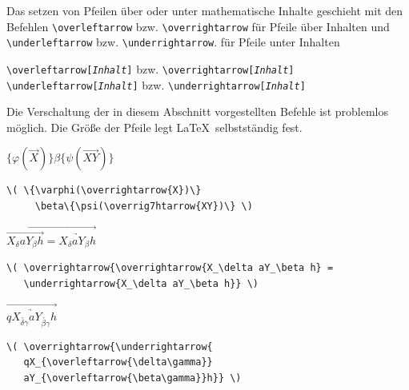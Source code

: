 \documentclass[a4paper,10pt,twoside]{scrbook}
\begin{document}
Das setzen von Pfeilen über oder unter 
mathematische Inhalte geschieht mit den Befehlen 
\verb!\overleftarrow! bzw. 
\verb!\overrightarrow! 
für Pfeile über Inhalten und 
\verb!\underleftarrow! bzw. 
\verb!\underrightarrow!. für 
Pfeile unter Inhalten


\begin{boxedminipage}{\textwidth}
\texttt{\textbackslash overleftarrow[{\textsl{Inhalt}}]} bzw. \texttt{\textbackslash overrightarrow[{\textsl{Inhalt}}]}\\
\texttt{\textbackslash underleftarrow[{\textsl{Inhalt}}]} bzw. \texttt{\textbackslash underrightarrow[{\textsl{Inhalt}}]}
\end{boxedminipage}


Die Verschaltung der in diesem Abschnitt vorgestellten Befehle ist problemlos möglich.
Die Größe der Pfeile legt \LaTeX\ selbstständig fest.

\begin{minipage}[c]{.25\textwidth}
\setlength{\parskip}{1em}
\centering
\( \{\varphi(\overrightarrow{X})\}
     \beta\{\psi(\overrightarrow{XY})\} \)
\end{minipage}
\hfill
\begin{minipage}[c]{.73\textwidth}
\setlength{\parskip}{1em}
\begin{lstlisting}[label=overrightarrowbeispiel, style=customlatex]
\( \{\varphi(\overrightarrow{X})\}
     \beta\{\psi(\overrig7htarrow{XY})\} \)
\end{lstlisting}
\end{minipage}

\begin{minipage}[c]{.25\textwidth}
\setlength{\parskip}{1em}
\centering
\( \overrightarrow{\overrightarrow{X_\delta aY_\beta h} = 
   \underrightarrow{X_\delta aY_\beta h}} \)
\end{minipage}
\hfill
\begin{minipage}[c]{.73\textwidth}
\setlength{\parskip}{1em}
\begin{lstlisting}[label=underrightarrowbeispiel, style=customlatex]
\( \overrightarrow{\overrightarrow{X_\delta aY_\beta h} = 
   \underrightarrow{X_\delta aY_\beta h}} \)
\end{lstlisting}
\end{minipage}

\begin{minipage}[c]{.25\textwidth}
\setlength{\parskip}{1em}
\centering
\( \overrightarrow{\underrightarrow{q X_{\overleftarrow{\delta\gamma}} 
                                    a Y_{\overleftarrow{\beta\gamma}}h}} \)
\end{minipage}
\hfill
\begin{minipage}[c]{.73\textwidth}
\setlength{\parskip}{1em}
\begin{lstlisting}[label=overleftarrowbeispiel, style=customlatex]
\( \overrightarrow{\underrightarrow{
   qX_{\overleftarrow{\delta\gamma}} 
   aY_{\overleftarrow{\beta\gamma}}h}} \)
\end{lstlisting}
\end{minipage}
\end{document}

